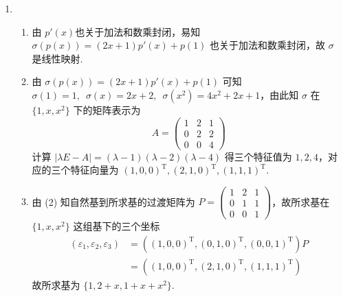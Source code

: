 \begin{enumerate}
    \item
    \begin{enumerate}
        \item 由 \(p'(x)\)也关于加法和数乘封闭，易知 \(\sigma(p(x))=(2x+1)p'(x)+p(1)\) 也关于加法和数乘封闭，故 \(\sigma\) 是线性映射.

        \item 由 \(\sigma(p(x))=(2x+1)p'(x)+p(1)\) 可知 \(\sigma(1)=1,\enspace\sigma(x)=2x+2,\enspace\sigma(x^2)=4x^2+2x+1\)，由此知 \(\sigma\) 在 \(\{1,x,x^2\}\) 下的矩阵表示为
        \[
        A=\begin{pmatrix}
            1 & 2 & 1\\
            0 & 2 & 2\\
            0 & 0 & 4
        \end{pmatrix}
        \]
        计算 \(|\lambda E-A|=(\lambda-1)(\lambda-2)(\lambda-4) \) 得三个特征值为 \(1,2,4\)，对应的三个特征向量为 \((1,0,0)^\mathrm{T},(2,1,0)^\mathrm{T},(1,1,1)^\mathrm{T}\).
        \item 由 (2) 知自然基到所求基的过渡矩阵为
        \(P=\begin{pmatrix}
            1 & 2 & 1\\
            0 & 1 & 1\\
            0 & 0 & 1
        \end{pmatrix}\)，故所求基在 \(\{1,x,x^2\}\) 这组基下的三个坐标
        \begin{align*}
            (\varepsilon_1,\varepsilon_2,\varepsilon_3) &= \left((1,0,0)^\mathrm{T},(0,1,0)^\mathrm{T},(0,0,1)^\mathrm{T}\right) P \\
            &= \left((1,0,0)^\mathrm{T},(2,1,0)^\mathrm{T},(1,1,1)^\mathrm{T}\right)
        \end{align*}
        故所求基为 \(\{1,2+x,1+x+x^2\}\).
    \end{enumerate}


\end{enumerate}
